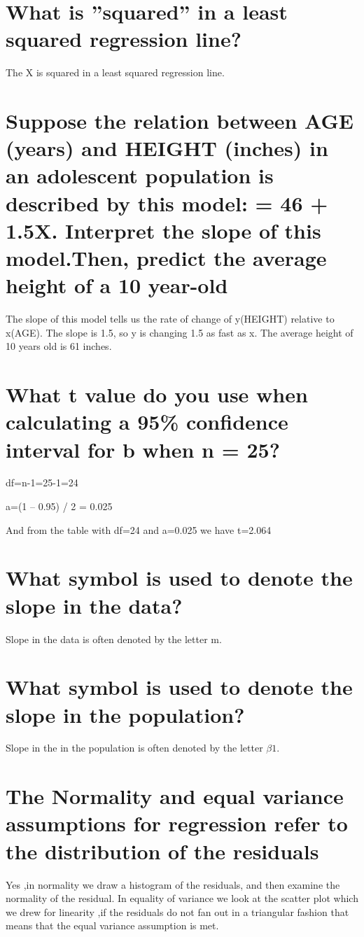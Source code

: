 \documentclass{article}
\begin{document}
\section{What is ”squared” in a least squared regression line?}

The X is squared in a least squared regression line.


\section{Suppose the relation between AGE (years) and HEIGHT (inches) in an adolescent population is described by this model: = 46 + 1.5X. Interpret the slope of this model.Then, predict the average height of a 10 year-old}

The slope of this model tells us the rate of change of y(HEIGHT) relative to x(AGE). The slope is 1.5, so y is changing 1.5 as fast as x. The average height of 10 years old is 61 inches.


\section{What t value do you use when calculating a 95\% confidence interval for b when n = 25?}
df=n-1=25-1=24

a=(1 – 0.95) / 2 = 0.025

And from the table with df=24 and a=0.025 we have t=2.064

\section{What symbol is used to denote the slope in the data?}

Slope in the data is often denoted by the letter m.

\section{What symbol is used to denote the slope in the population?}

Slope in the in the population is often denoted by the letter $\beta1$.

\section{The Normality and equal variance assumptions for regression refer to the distribution of the residuals}

Yes ,in normality we draw a histogram of the residuals, and then examine the normality of the residual. In equality of variance we look at the scatter plot which we drew for linearity ,if the residuals do not fan out in a triangular fashion that means that the equal variance assumption is met.
\end{document}
